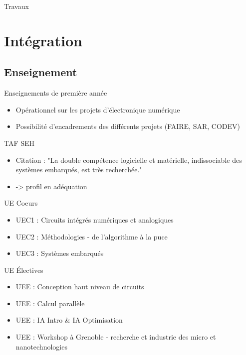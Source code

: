\documentclass[t,compress,mathserif,12pt,xcolor=dvipsnames]{beamer}
\begin{document}
\begin{frame}[c]{Travaux}

\end{frame}

\section{Intégration}
\subsection{Enseignement}
\begin{frame}[c]{Enseignements de première année}
  \begin{itemize}
    \item Opérationnel sur les projets d'électronique numérique 
    \item Possibilité d'encadrements des différents projets (FAIRE, SAR, CODEV)
  \end{itemize}
\end{frame}
\begin{frame}[c]{TAF SEH}
  \begin{itemize}
      \item Citation : "La double compétence logicielle et matérielle, indissociable des systèmes embarqués, est très recherchée."
      \item -> profil en adéquation
  \end{itemize}
\end{frame}
\begin{frame}[c]{UE Coeurs}
  \begin{itemize}
      \item UEC1 : Circuits intégrés numériques et analogiques
      \item UEC2 : Méthodologies - de l’algorithme à la puce
      \item UEC3 : Systèmes embarqués
  \end{itemize}
\end{frame}
\begin{frame}[c]{UE \'Electives}
  \begin{itemize}
      \item UEE : Conception haut niveau de circuits
      \item UEE : Calcul parallèle
      \item UEE : IA Intro \& IA Optimisation
      \item UEE : Workshop à Grenoble - recherche et industrie des micro et nanotechnologies
  \end{itemize}
\end{frame}
\end{document}
